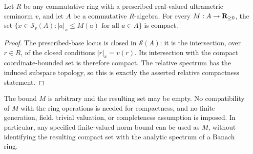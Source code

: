 \begin{corollary}\label{spectrum:compact-relative-bounds}
\leanok
{}
Let $R$ be any commutative ring with a prescribed real-valued ultrametric seminorm $v$,
and let $A$ be a commutative $R$-algebra. For every $M:A\to\mathbf{R}_{\ge0}$, the set
$\{x\in\mathcal S_v(A):|a|_x\le M(a)\text{ for all }a\in A\}$ is compact.
\end{corollary}
\begin{proof}
The prescribed-base locus is closed in $\mathcal S(A)$: it is the intersection,
over $r\in R$, of the closed conditions $|r|_x=v(r)$.
Its intersection with the compact coordinate-bounded set is therefore compact.
The relative spectrum has the induced subspace topology, so this is exactly
the asserted relative compactness statement.
\end{proof}

\begin{remark}\label{spectrum:compact-bounds-scope}
The bound $M$ is arbitrary and the resulting set may be empty. No compatibility
of $M$ with the ring operations is needed for compactness, and no finite generation,
field, trivial valuation, or completeness assumption is imposed. In particular,
any specified finite-valued norm bound can be used as $M$, without identifying
the resulting compact set with the analytic spectrum of a Banach ring.
\end{remark}
